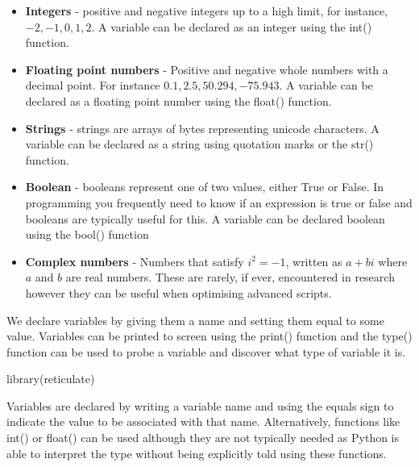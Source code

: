 \documentclass[
]{book}
\newenvironment{Shaded}{\begin{snugshade}}{\end{snugshade}}
\newcommand{\FunctionTok}[1]{\textcolor[rgb]{0.00,0.00,0.00}{#1}}
\newcommand{\NormalTok}[1]{#1}
\begin{document}
\begin{itemize}
\item
  \textbf{Integers} - positive and negative integers up to a high limit, for instance, \(-2, -1, 0, 1, 2\). A variable can be declared as an integer using the int() function.
\item
  \textbf{Floating point numbers} - Positive and negative whole numbers with a decimal point. For instance \(0.1, 2.5, 50.294, -75.943\). A variable can be declared as a floating point number using the float() function.
\item
  \textbf{Strings} - strings are arrays of bytes representing unicode characters. A variable can be declared as a string using quotation marks or the str() function.
\item
  \textbf{Boolean} - booleans represent one of two values, either True or False. In programming you frequently need to know if an expression is true or false and booleans are typically useful for this. A variable can be declared boolean using the bool() function
\item
  \textbf{Complex numbers} - Numbers that satisfy \(i^2=-1\), written as \(a+bi\) where \(a\) and \(b\) are real numbers. These are rarely, if ever, encountered in research however they can be useful when optimising advanced scripts.
\end{itemize}

We declare variables by giving them a name and setting them equal to some value. Variables can be printed to screen using the print() function and the type() function can be used to probe a variable and discover what type of variable it is.

\begin{Shaded}
\begin{Highlighting}[]
\FunctionTok{library}\NormalTok{(reticulate)}
\end{Highlighting}
\end{Shaded}

Variables are declared by writing a variable name and using the equals sign to indicate the value to be associated with that name. Alternatively, functions like int() or float() can be used although they are not typically needed as Python is able to interpret the type without being explicitly told using these functions.
\end{document}
